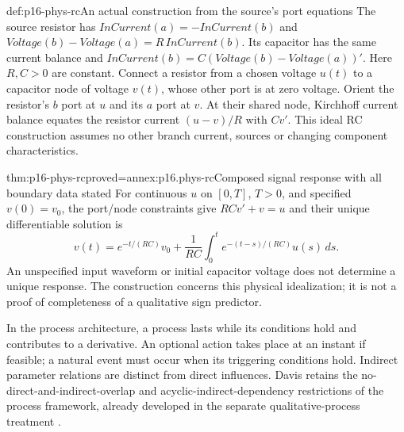 \begin{hbdefinition}{def:p16-phys-rc}{An actual construction from the source's port equations}
The source resistor has \(InCurrent(a)=-InCurrent(b)\) and
\(Voltage(b)-Voltage(a)=R\,InCurrent(b)\). Its capacitor has the same
current balance and \(InCurrent(b)=C(Voltage(b)-Voltage(a))'\).
Here \(R,C>0\) are constant. Connect a resistor from a chosen voltage
\(u(t)\) to a capacitor node of voltage \(v(t)\), whose other port is
at zero voltage. Orient the resistor's \(b\) port at \(u\) and its
\(a\) port at \(v\). At their shared node, Kirchhoff current balance
equates the resistor current \((u-v)/R\) with \(Cv'\).
This ideal RC construction assumes no other branch current, sources or
changing component characteristics.
\end{hbdefinition}

\begin{hbtheorem}{thm:p16-phys-rc}{proved=annex:p16.phys-rc}{Composed signal response with all boundary data stated}
For continuous \(u\) on \([0,T]\), \(T>0\), and specified \(v(0)=v_0\), the
port/node constraints give \(RCv'+v=u\) and their unique differentiable
solution is
\[
 v(t)=e^{-t/(RC)}v_0+
       \frac1{RC}\int_0^t e^{-(t-s)/(RC)}u(s)\,ds.
\]
An unspecified input waveform or initial capacitor voltage does not determine
a unique response. The construction concerns this physical idealization;
it is not a proof of completeness of a qualitative sign predictor.
\end{hbtheorem}

In the process architecture, a process lasts while its conditions hold
and contributes to a derivative. An optional action takes place at an
instant if feasible; a natural event must occur when its triggering conditions
hold. Indirect parameter relations are distinct from direct influences.
Davis retains the no-direct-and-indirect-overlap and acyclic-indirect-dependency
restrictions of the process framework, already developed in the separate
qualitative-process treatment \cite[pp.~601--602]{Davis2008PhysicalReasoning}.

